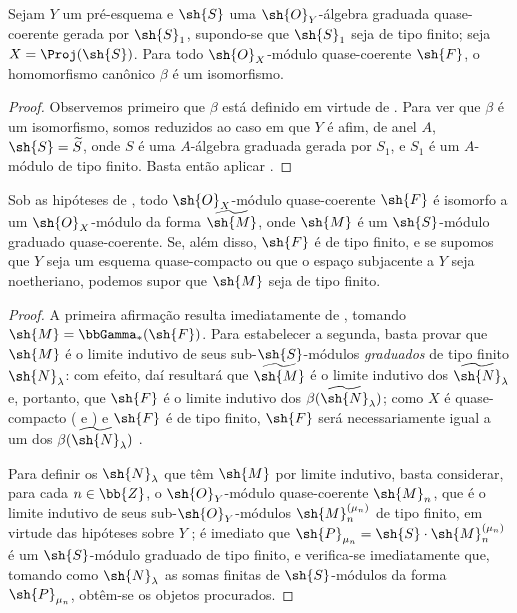 \documentclass[oneside,10pt]{amsart}
\newcommand{\oldpage}[2][]{\marginnote{\normalfont\footnotesize\textbf{#1}~|~#2}\ignorespaces}
\let\EGAOriginalLabel\label
\renewcommand{\label}[1]{\phantomsection\EGAOriginalLabel{#1}}
\begin{document}
\begin{theorem}[3.4.4]
\label{II.3.4.4}
Sejam $Y$ um pré-esquema e $\sh{S}$ uma $\sh{O}_Y$-álgebra graduada quase-coerente gerada por $\sh{S}_1$, supondo-se que $\sh{S}_1$ seja de tipo finito;
seja $X=\Proj(\sh{S})$.
Para todo $\sh{O}_X$-módulo quase-coerente $\sh{F}$, o homomorfismo canônico $\beta$  é um isomorfismo.
\end{theorem}

\begin{proof}
Observemos primeiro que $\beta$ está definido em virtude de .
Para ver que $\beta$ é um isomorfismo, somos reduzidos ao caso em que $Y$ é afim, de anel $A$, $\sh{S}=\widetilde{S}$, onde $S$ é uma $A$-álgebra graduada gerada por $S_1$, e $S_1$ é um $A$-módulo de tipo finito.
Basta então aplicar .
\end{proof}

\begin{corollary}[3.4.5]
\label{II.3.4.5}
Sob as hipóteses de , todo $\sh{O}_X$-módulo quase-coerente $\sh{F}$ é isomorfo a um $\sh{O}_X$-módulo da forma $\widetilde{\sh{M}}$, onde $\sh{M}$ é um $\sh{S}$-módulo graduado quase-coerente.
Se, além disso, $\sh{F}$ é de tipo finito, e se supomos que $Y$ seja um esquema quase-compacto ou que o espaço subjacente a $Y$ seja noetheriano, podemos supor que $\sh{M}$ seja de tipo finito.
\end{corollary}
\oldpage[II]{60}
\begin{proof}
A primeira afirmação resulta imediatamente de , tomando $\sh{M}=\bbGamma_*(\sh{F})$.
Para estabelecer a segunda, basta provar que $\sh{M}$ é o limite indutivo de seus sub-$\sh{S}$-módulos \emph{graduados} de tipo finito $\sh{N}_\lambda$: com efeito, daí resultará que $\widetilde{\sh{M}}$ é o limite indutivo dos $\widetilde{\sh{N}}_\lambda$  e, portanto, que $\sh{F}$ é o limite indutivo dos $\beta(\widetilde{\sh{N}}_\lambda)$;
como $X$ é quase-compacto ( e ) e $\sh{F}$ é de tipo finito, $\sh{F}$ será necessariamente igual a um dos $\beta(\widetilde{\sh{N}}_\lambda)$ .

Para definir os $\sh{N}_\lambda$ que têm $\sh{M}$ por limite indutivo, basta considerar, para cada $n\in\bb{Z}$, o $\sh{O}_Y$-módulo quase-coerente $\sh{M}_n$, que é o limite indutivo de seus sub-$\sh{O}_Y$-módulos $\sh{M}_n^{(\mu_n)}$ de tipo finito, em virtude das hipóteses sobre $Y$ ;
é imediato que $\sh{P}_{\mu_n}=\sh{S}\cdot\sh{M}_n^{(\mu_n)}$ é um $\sh{S}$-módulo graduado de tipo finito, e verifica-se imediatamente que, tomando como $\sh{N}_\lambda$ as somas finitas de $\sh{S}$-módulos da forma $\sh{P}_{\mu_n}$, obtêm-se os objetos procurados.
\end{proof}
\end{document}
